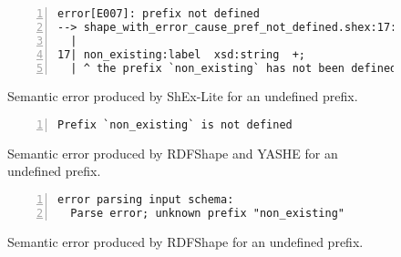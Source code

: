 \begin{figure}
  \begin{lstlisting}[numbers=left,basicstyle=\ttfamily\scriptsize]
error[E007]: prefix not defined
--> shape_with_error_cause_pref_not_defined.shex:17:3
  |
17| non_existing:label  xsd:string  +;
  | ^ the prefix `non_existing` has not been defined
  \end{lstlisting}
  \caption[Semantic error produced by ShEx-Lite for an undefined prefix]{Semantic error produced by ShEx-Lite for an undefined prefix.}
  \label{fig:err-non-def-pref-2}
\end{figure}

\begin{figure}
  \begin{lstlisting}[numbers=left,basicstyle=\ttfamily\scriptsize]
Prefix `non_existing` is not defined
  \end{lstlisting}
  \caption[Semantic error produced by RDFShape and YASHE for an undefined prefix]{Semantic error produced by RDFShape and YASHE for an undefined prefix.}
  \label{fig:err-non-def-pref-3}
\end{figure}

\begin{figure}[t]
  \begin{lstlisting}[numbers=left,basicstyle=\ttfamily\scriptsize]
error parsing input schema:
  Parse error; unknown prefix "non_existing"
  \end{lstlisting}
  \caption[Semantic error produced by RDFShape for an undefined prefix]{Semantic error produced by RDFShape for an undefined prefix.}
  \label{fig:err-non-def-pref-4}
\end{figure}

